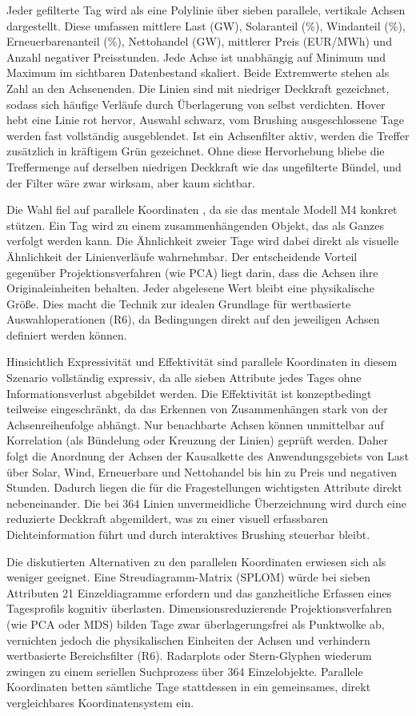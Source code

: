 Jeder gefilterte Tag wird als eine Polylinie über sieben parallele, vertikale
Achsen dargestellt. Diese umfassen mittlere Last (GW), Solaranteil (\%), Windanteil (\%), Erneuerbarenanteil (\%), Nettohandel
(GW), mittlerer Preis (EUR/MWh) und Anzahl negativer Preisstunden. Jede Achse ist unabhängig auf
Minimum und Maximum im sichtbaren Datenbestand skaliert. Beide Extremwerte stehen als Zahl an den
Achsenenden. Die Linien sind mit niedriger Deckkraft gezeichnet, sodass sich häufige Verläufe durch
Überlagerung von selbst verdichten. Hover hebt eine Linie rot hervor, Auswahl schwarz, vom Brushing
ausgeschlossene Tage werden fast vollständig ausgeblendet. Ist ein Achsenfilter aktiv, werden die
Treffer zusätzlich in kräftigem Grün gezeichnet. Ohne diese Hervorhebung bliebe die Treffermenge auf
derselben niedrigen Deckkraft wie das ungefilterte Bündel, und der Filter wäre zwar wirksam, aber
kaum sichtbar.

Die Wahl fiel auf parallele Koordinaten \cite{Inselberg1990,Heinrich2013}, da sie das mentale Modell M4
konkret stützen. Ein Tag wird zu einem zusammenhängenden Objekt, das als Ganzes verfolgt werden kann.
Die Ähnlichkeit zweier Tage wird dabei direkt als visuelle Ähnlichkeit der Linienverläufe wahrnehmbar.
Der entscheidende Vorteil gegenüber Projektionsverfahren (wie PCA) liegt darin, dass die Achsen ihre
Originaleinheiten behalten. Jeder abgelesene Wert bleibt eine physikalische Größe. Dies macht die
Technik zur idealen Grundlage für wertbasierte Auswahloperationen (R6), da Bedingungen direkt auf den
jeweiligen Achsen definiert werden können.

Hinsichtlich Expressivität und Effektivität sind parallele Koordinaten in diesem Szenario vollständig expressiv, da alle sieben Attribute jedes Tages ohne Informationsverlust abgebildet werden.
Die Effektivität ist konzeptbedingt teilweise eingeschränkt, da das Erkennen von Zusammenhängen stark von
der Achsenreihenfolge abhängt. Nur benachbarte Achsen können unmittelbar auf Korrelation (als Bündelung
oder Kreuzung der Linien) geprüft werden. Daher folgt die Anordnung der Achsen der Kausalkette des
Anwendungsgebiets von Last über Solar, Wind, Erneuerbare und Nettohandel bis hin zu Preis und negativen Stunden. Dadurch liegen die für die Fragestellungen
wichtigsten Attribute direkt nebeneinander. Die bei $364$ Linien unvermeidliche Überzeichnung wird durch
eine reduzierte Deckkraft abgemildert, was zu einer visuell erfassbaren Dichteinformation führt und
durch interaktives Brushing steuerbar bleibt.

Die diskutierten Alternativen zu den parallelen Koordinaten erwiesen sich als weniger geeignet. Eine Streudiagramm-Matrix (SPLOM) würde bei sieben Attributen 21 Einzeldiagramme erfordern und das ganzheitliche Erfassen eines Tagesprofils kognitiv überlasten. Dimensionsreduzierende Projektionsverfahren (wie PCA oder MDS) bilden Tage zwar überlagerungsfrei als Punktwolke ab, vernichten jedoch die physikalischen Einheiten der Achsen und verhindern wertbasierte Bereichsfilter (R6). Radarplots oder Stern-Glyphen wiederum zwingen zu einem seriellen Suchprozess über 364 Einzelobjekte. Parallele Koordinaten betten sämtliche Tage stattdessen in ein gemeinsames, direkt vergleichbares Koordinatensystem ein.

